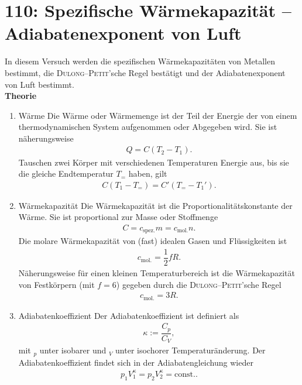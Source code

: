 \newpage
\section{110: Spezifische Wärmekapazität -- Adiabatenexponent von Luft}
In diesem Versuch werden die spezifischen Wärmekapazitäten von Metallen bestimmt, die \textsc{Dulong}--\textsc{Petit}'sche Regel bestätigt und der Adiabatenexponent von Luft bestimmt.\\
\textbf{Theorie} 
\begin{enumerate}[label=--]
        \item Wärme \hspace{25pt} 
                Die Wärme oder Wärmemenge ist der Teil der Energie der von einem thermodynamischen System aufgenommen oder Abgegeben wird.
                Sie ist näherungsweise
                \begin{align} 
                        Q=C\left(T_2-T_1\right)
                .\end{align} 
                Tauschen zwei Körper mit verschiedenen Temperaturen Energie aus, bis sie die gleiche Endtemperatur $T_=$ haben, gilt
                \begin{align} 
                        C\left(T_1-T_=\right)=C'\left(T_=-T_1'\right)
                .\end{align} 
        \item Wärmekapazität \hspace{25pt} 
                Die Wärmekapazität ist die Proportionalitätskonstante der Wärme.
                Sie ist proportional zur Masse oder Stoffmenge
                \begin{align} 
                        C=c _{\text{spez.}}m=c _{\text{mol.}}n
                .\end{align} 
                Die molare Wärmekapazität von (fast) idealen Gasen und Flüssigkeiten ist
                \begin{align} 
                        c _{\text{mol.}}=\dfrac{1}{2}fR
                .\end{align} 
                Näherungsweise für einen kleinen Temperaturbereich ist die Wärmekapazität von Festkörpern (mit $f=6$) gegeben durch die \textsc{Dulong}--\textsc{Petit}'sche Regel
                \begin{align} 
                        c _{\text{mol.}}=3R
                .\end{align} 
        \item Adiabatenkoeffizient \hspace{25pt} 
                Der Adiabatenkoeffizient ist definiert als 
                \begin{align} 
                        \kappa :=\dfrac{C_p}{C_V}
                ,\end{align} 
                mit ${}_p$ unter isobarer und ${}_V$ unter isochorer Temperaturänderung.
                Der Adiabatenkoeffizient findet sich in der Adiabatengleichung wieder
                \begin{align} 
                        p_1V_1^\kappa =p_2V_2^\kappa =\text{const.}
                .\end{align} 
\end{enumerate}
